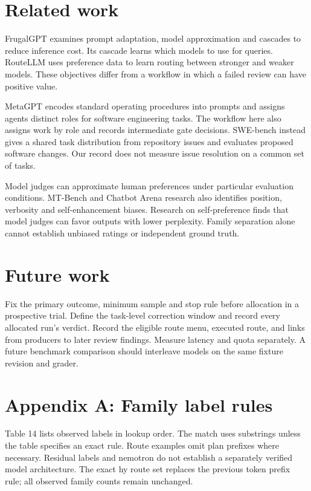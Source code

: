 \documentclass[
  10pt,
  a4paper,
]{article}
\begin{document}
\section{Related work}\label{related-work}

FrugalGPT \citep{chen2023frugal} examines prompt adaptation, model
approximation and cascades to reduce inference cost. Its cascade learns
which models to use for queries. RouteLLM \citep{ong2024route} uses
preference data to learn routing between stronger and weaker models.
These objectives differ from a workflow in which a failed review can
have positive value.

MetaGPT \citep{hong2024meta} encodes standard operating procedures into
prompts and assigns agents distinct roles for software engineering
tasks. The workflow here also assigns work by role and records
intermediate gate decisions. SWE-bench \citep{jimenez2023swe} instead
gives a shared task distribution from repository issues and evaluates
proposed software changes. Our record does not measure issue resolution
on a common set of tasks.

Model judges can approximate human preferences under particular
evaluation conditions. MT-Bench and Chatbot Arena research
\citep{zheng2023judge} also identifies position, verbosity and
self-enhancement biases. Research on self-preference
\citep{wataoka2024bias} finds that model judges can favor outputs with
lower perplexity. Family separation alone cannot establish unbiased
ratings or independent ground truth.

\section{Future work}\label{future-work}

Fix the primary outcome, minimum sample and stop rule before allocation
in a prospective trial. Define the task-level correction window and
record every allocated run's verdict. Record the eligible route menu,
executed route, and links from producers to later review findings.
Measure latency and quota separately. A future benchmark comparison
should interleave models on the same fixture revision and grader.

\section{Appendix A: Family label
rules}\label{appendix-a-family-label-rules}

Table 14 lists observed labels in lookup order. The match uses
substrings unless the table specifies an exact rule. Route examples omit
plan prefixes where necessary. Residual labels and nemotron do not
establish a separately verified model architecture. The exact hy route
set replaces the previous token prefix rule; all observed family counts
remain unchanged.
\end{document}
